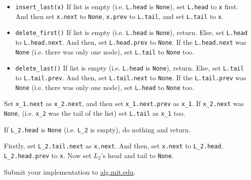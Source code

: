 \documentclass[12pt,twoside]{article}
\begin{document}
\begin{problems}
\begin{problemparts}
\begin{itemize}
  \item \texttt{insert\_last(x)} If list is empty
    (i.e. \texttt{L.head} is \texttt{None}), set \texttt{L.head} to
    \texttt{x} first. And then set \texttt{x.next} to \texttt{None},
    \texttt{x.prev} to \texttt{L.tail}, and set \texttt{L.tail} to
    \texttt{x}.

  \item \texttt{delete\_first()} If list is empty
    (i.e. \texttt{L.head} is \texttt{None}), return. Else, set
    \texttt{L.head} to \texttt{L.head.next}. And then, set
    \texttt{L.head.prev} to \texttt{None}.  If the
    \texttt{L.head.next} was \texttt{None} (i.e. there was only one
    node), set \texttt{L.tail} to \texttt{None} too.

  \item \texttt{delete\_last()} If list is empty (i.e. \texttt{L.head}
    is \texttt{None}), return. Else, set \texttt{L.tail} to
    \texttt{L.tail.prev}. And then, set \texttt{L.tail.next} to
    \texttt{None}. If the \texttt{L.tail.prev} was \texttt{None}
    (i.e. there was only one node), set \texttt{L.head} to
    \texttt{None} too.
  \end{itemize}

  \problempart %
  Set \texttt{x\_1.next} as \texttt{x\_2.next}, and then set
  \texttt{x\_1.next.prev} as \texttt{x\_1}. If \texttt{x\_2.next} was
  \texttt{None}, (i.e. \texttt{x\_2} was the tail of the list) set
  \texttt{L.tail} as \texttt{x\_1} too.

  \problempart %
  If \texttt{L\_2.head} is \texttt{None} (i.e. \texttt{L\_2} is
  empty), do nothing and return.

  Firstly, set \texttt{L\_2.tail.next} as \texttt{x.next}. And then,
  set \texttt{x.next} to \texttt{L\_2.head}, \texttt{L\_2.head.prev}
  to \texttt{x}. Now set $L_2$'s head and tail to \texttt{None}.
  
  \problempart Submit your implementation to {\small\url{alg.mit.edu}}.
  
\end{problemparts}

\end{problems}
\end{document}
